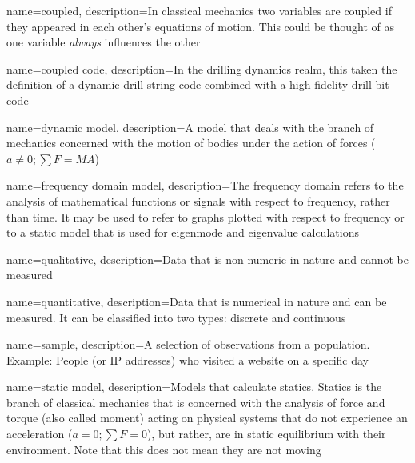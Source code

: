 

\newcommand*{\comma}{,}


{
	name=coupled,
	description=In classical mechanics two variables are coupled if they appeared in each other's equations of motion.  This could be thought of as one variable \textit{always} influences the other
}

{
	name=coupled code,
	description=In the drilling dynamics realm\comma{} this taken the definition of a dynamic drill string code combined with a high fidelity drill bit code
}

\newcommand*{\dynamicforcebalance}{$a \neq 0; \sum F = MA$}
{
	name=dynamic model,
	description=A model that deals with the branch of mechanics concerned with the motion of bodies under the action of forces (\dynamicforcebalance)
}

{
	name=frequency domain model,
	description=The frequency domain refers to the analysis of mathematical functions or signals with respect to frequency\comma{} rather than time.  It may be used to refer to graphs plotted with respect to frequency or to a static model that is used for eigenmode and eigenvalue calculations
}

{
	name=qualitative,
	description={Data that is non-numeric in nature and cannot be measured}
}

{
	name=quantitative,
	description={Data that is numerical in nature and can be measured.  It can be classified into two types: discrete and continuous}
}

{
	name=sample,
	description={A selection of observations from a population.  Example: People (or IP addresses) who visited a website on a specific day}
}

\newcommand*{\staticforcebalance}{$a = 0; \sum F = 0$}
{
	name=static model,
	description=Models that calculate statics.  Statics is the branch of classical mechanics that is concerned with the analysis of force and torque (also called moment) acting on physical systems that do not experience an acceleration (\staticforcebalance)\comma{} but rather\comma{} are in static equilibrium with their environment.  Note that this does not mean they are not moving
}

